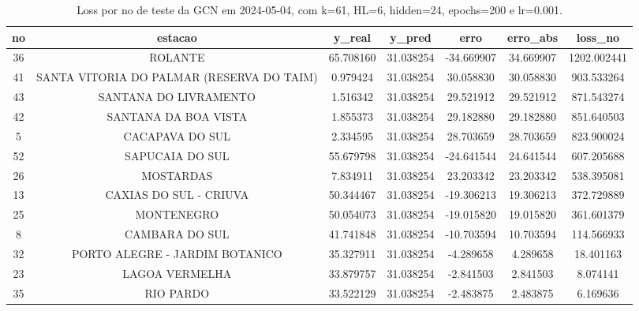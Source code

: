 \begin{table}[h]
\centering
\caption{Loss por no de teste da GCN em 2024-05-04, com k=61, HL=6, hidden=24, epochs=200 e lr=0.001.}
\label{tab:gcn_loss_k61_hl6_h24_e200_d20240504}
\begin{tabular}{ccccccc}
\toprule
no & estacao & y\_real & y\_pred & erro & erro\_abs & loss\_no \\
\midrule
36 & ROLANTE & 65.708160 & 31.038254 & -34.669907 & 34.669907 & 1202.002441 \\
41 & SANTA VITORIA DO PALMAR (RESERVA DO TAIM) & 0.979424 & 31.038254 & 30.058830 & 30.058830 & 903.533264 \\
43 & SANTANA DO LIVRAMENTO & 1.516342 & 31.038254 & 29.521912 & 29.521912 & 871.543274 \\
42 & SANTANA DA BOA VISTA & 1.855373 & 31.038254 & 29.182880 & 29.182880 & 851.640503 \\
5 & CACAPAVA DO SUL & 2.334595 & 31.038254 & 28.703659 & 28.703659 & 823.900024 \\
52 & SAPUCAIA DO SUL & 55.679798 & 31.038254 & -24.641544 & 24.641544 & 607.205688 \\
26 & MOSTARDAS & 7.834911 & 31.038254 & 23.203342 & 23.203342 & 538.395081 \\
13 & CAXIAS DO SUL - CRIUVA & 50.344467 & 31.038254 & -19.306213 & 19.306213 & 372.729889 \\
25 & MONTENEGRO & 50.054073 & 31.038254 & -19.015820 & 19.015820 & 361.601379 \\
8 & CAMBARA DO SUL & 41.741848 & 31.038254 & -10.703594 & 10.703594 & 114.566933 \\
32 & PORTO ALEGRE - JARDIM BOTANICO & 35.327911 & 31.038254 & -4.289658 & 4.289658 & 18.401163 \\
23 & LAGOA VERMELHA & 33.879757 & 31.038254 & -2.841503 & 2.841503 & 8.074141 \\
35 & RIO PARDO & 33.522129 & 31.038254 & -2.483875 & 2.483875 & 6.169636 \\
\bottomrule
\end{tabular}
\end{table}
